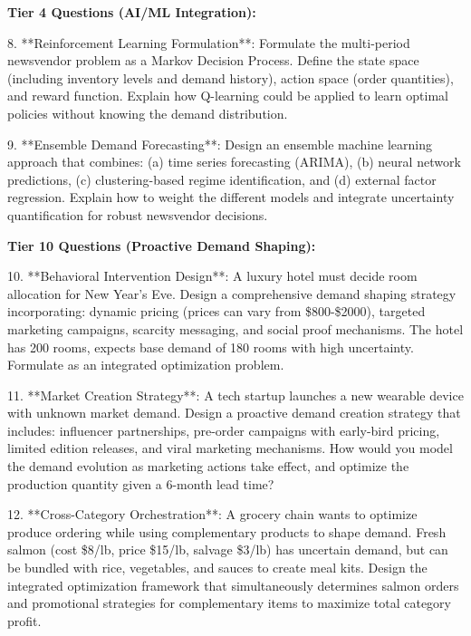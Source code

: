 \documentclass{article}
\begin{document}
\textbf{Tier 4 Questions (AI/ML Integration):}

8. **Reinforcement Learning Formulation**: Formulate the multi-period newsvendor problem as a Markov Decision Process. Define the state space (including inventory levels and demand history), action space (order quantities), and reward function. Explain how Q-learning could be applied to learn optimal policies without knowing the demand distribution.

9. **Ensemble Demand Forecasting**: Design an ensemble machine learning approach that combines: (a) time series forecasting (ARIMA), (b) neural network predictions, (c) clustering-based regime identification, and (d) external factor regression. Explain how to weight the different models and integrate uncertainty quantification for robust newsvendor decisions.

\textbf{Tier 10 Questions (Proactive Demand Shaping):}

10. **Behavioral Intervention Design**: A luxury hotel must decide room allocation for New Year's Eve. Design a comprehensive demand shaping strategy incorporating: dynamic pricing (prices can vary from \$800-\$2000), targeted marketing campaigns, scarcity messaging, and social proof mechanisms. The hotel has 200 rooms, expects base demand of 180 rooms with high uncertainty. Formulate as an integrated optimization problem.

11. **Market Creation Strategy**: A tech startup launches a new wearable device with unknown market demand. Design a proactive demand creation strategy that includes: influencer partnerships, pre-order campaigns with early-bird pricing, limited edition releases, and viral marketing mechanisms. How would you model the demand evolution as marketing actions take effect, and optimize the production quantity given a 6-month lead time?

12. **Cross-Category Orchestration**: A grocery chain wants to optimize produce ordering while using complementary products to shape demand. Fresh salmon (cost \$8/lb, price \$15/lb, salvage \$3/lb) has uncertain demand, but can be bundled with rice, vegetables, and sauces to create meal kits. Design the integrated optimization framework that simultaneously determines salmon orders and promotional strategies for complementary items to maximize total category profit.
\end{document}
